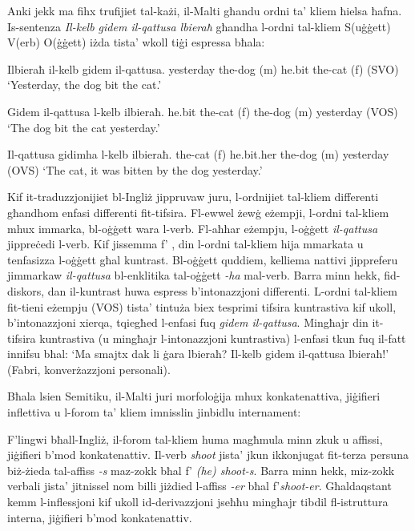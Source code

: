 \documentclass[]{../../metanetpaper}
\begin{document}
\begin{multicols}{2}
Anki jekk ma fihx trufijiet tal-każi, il-Malti għandu ordni ta’ kliem ħielsa ħafna. Is-sentenza \emph{Il-kelb gidem il-qattusa lbieraħ} għandha l-ordni tal-kliem S(uġġett) V(erb) O(ġġett) iżda tista’ wkoll tiġi espressa bħala:

\begin{examples}\label{WO_no_clitics}
\item
\gll Ilbieraħ il-kelb gidem il-qattusa.
yesterday	{the-dog (m)} he.bit	{the-cat (f)}
\gln (SVO)
\glt `Yesterday, the dog bit the cat.'
\glend

\item
\gll Gidem il-qattusa l-kelb ilbieraħ.
he.bit {the-cat (f)} {the-dog (m)} yesterday
\gln (VOS)
\glt `The dog bit the cat yesterday.'
\glend

\item
\gll Il-qattusa gidimha l-kelb ilbieraħ.
{the-cat (f)} he.bit.her {the-dog (m)} yesterday
\gln (OVS)
\glt `The cat, it was bitten by the dog yesterday.'
\glend
\end{examples}

Kif it-traduzzjonijiet bl-Ingliż jippruvaw juru, l-ordnijiet tal-kliem differenti għandhom enfasi differenti fit-tifsira. Fl-ewwel żewġ eżempji, l-ordni tal-kliem mhux immarka, bl-oġġett wara l-verb. Fl-aħħar eżempju, l-oġġett \emph{il-qattusa} jippreċedi l-verb. Kif jissemma f' \cite{Fabri:1993}, din l-ordni tal-kliem hija mmarkata u tenfasizza l-oġġett għal kuntrast. Bl-oġġett quddiem, kelliema nattivi jippreferu jimmarkaw \emph{il-qattusa} bl-enklitika tal-oġġett \emph{-ha} mal-verb. Barra minn hekk, fid-diskors, dan il-kuntrast huwa espress b’intonazzjoni differenti. L-ordni tal-kliem fit-tieni eżempju (VOS) tista’ tintuża biex tesprimi tifsira kuntrastiva kif ukoll, b’intonazzjoni xierqa, tqiegħed l-enfasi fuq \emph{gidem il-qattusa}. Mingħajr din it-tifsira kuntrastiva (u mingħajr l-intonazzjoni kuntrastiva) l-enfasi tkun fuq il-fatt innifsu bħal: `Ma smajtx dak li ġara lbieraħ? Il-kelb gidem il-qattusa lbieraħ!' (Fabri, konverżazzjoni personali).

Bħala lsien Semitiku, il-Malti juri morfoloġija mhux konkatenattiva, jiġifieri inflettiva u l-forom ta’ kliem imnisslin jinbidlu internament:

F’lingwi bħall-Ingliż, il-forom tal-kliem huma magħmula minn zkuk u affissi, jiġifieri b’mod konkatenattiv. Il-verb \emph{shoot} jista’ jkun ikkonjugat fit-terza persuna biż-żieda tal-affiss \emph{-s} maz-zokk bħal f’ \emph{(he) shoot-s}. Barra minn hekk, miz-zokk verbali jista’ jitnissel nom billi jiżdied l-affiss \emph{-er} bħal f’\emph{shoot-er}. Għaldaqstant kemm l-inflessjoni kif ukoll id-derivazzjoni jseħħu mingħajr tibdil fl-istruttura interna, jiġifieri b’mod konkatenattiv. 


\end{multicols}
\end{document}
